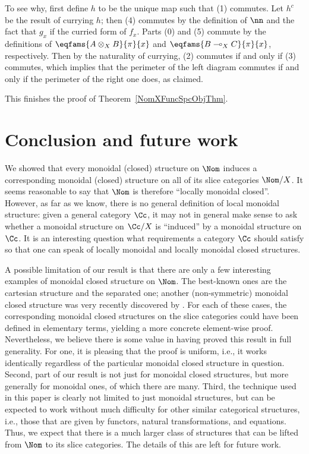 \documentclass[twoside,11pt]{entics}
\begin{document}
To see why, first define $h$ to be the unique map such that (1)
commutes. Let $h^c$ be the result of currying $h$; then (4) commutes
by the definition of $\nn$ and the fact that $g_x$ if the curried form
of $f_x$. Parts (0) and (5) commute by the definitions of
$\eqfams{A\otimes_X B}{\pi}{x}$ and $\eqfams{B\multimap_X C}{\pi}{x}$,
respectively. Then by the naturality of currying, (2) commutes if and
only if (3) commutes, which implies that the perimeter of the left
diagram commutes if and only if the perimeter of the right one does,
as claimed.

This finishes the proof of Theorem~\ref{NomXFuncSpcObjThm}.

\section{Conclusion and future work}

We showed that every monoidal (closed) structure on $\Nom$ induces a
corresponding monoidal (closed) structure on all of its slice
categories $\Nom/X$. It seems reasonable to say that $\Nom$ is
therefore ``locally monoidal closed''. However, as far as we know,
there is no general definition of local monoidal structure: given a
general category $\Cc$, it may not in general make sense to ask
whether a monoidal structure on $\Cc/X$ is ``induced'' by a monoidal
structure on $\Cc$. It is an interesting question what requirements a
category $\Cc$ should satisfy so that one can speak of locally
monoidal and locally monoidal closed structures.

A possible limitation of our result is that there are only a few
interesting examples of monoidal closed structure on $\Nom$. The
best-known ones are the cartesian structure and the separated one;
another (non-symmetric) monoidal closed structure was very recently
discovered by \cite{lenke2026}. For each of these cases, the
corresponding monoidal closed structures on the slice categories could
have been defined in elementary terms, yielding a more concrete
element-wise proof. Nevertheless, we believe there is some value in
having proved this result in full generality. For one, it is pleasing
that the proof is uniform, i.e., it works identically regardless of
the particular monoidal closed structure in question. Second, part of
our result is not just for monoidal closed structures, but more
generally for monoidal ones, of which there are many. Third, the
technique used in this paper is clearly not limited to just monoidal
structures, but can be expected to work without much difficulty for
other similar categorical structures, i.e., those that are given by
functors, natural transformations, and equations. Thus, we expect that
there is a much larger class of structures that can be lifted from
$\Nom$ to its slice categories. The details of this are left for
future work.
\end{document}
